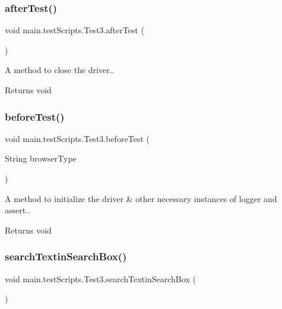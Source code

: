 \subsubsection{\texorpdfstring{after\+Test()}{afterTest()}}
{\footnotesize\ttfamily void main.\+test\+Scripts.\+Test3.\+after\+Test (\begin{DoxyParamCaption}{ }\end{DoxyParamCaption})}

A  method to close the driver.. \begin{DoxyReturn}{Returns}
void 
\end{DoxyReturn}
\mbox{\label{classmain_1_1test_scripts_1_1_test3_a6def60a96025e336f8fa0d48c7de9707}} 
\subsubsection{\texorpdfstring{before\+Test()}{beforeTest()}}
{\footnotesize\ttfamily void main.\+test\+Scripts.\+Test3.\+before\+Test (\begin{DoxyParamCaption}\item[{String}]{browser\+Type }\end{DoxyParamCaption})}

A  method to initialize the driver \& other necessary instances of logger and assert.. \begin{DoxyReturn}{Returns}
void 
\end{DoxyReturn}
\mbox{\label{classmain_1_1test_scripts_1_1_test3_a7d7770a67e1c5d3b4412342457a039f6}} 
\subsubsection{\texorpdfstring{search\+Textin\+Search\+Box()}{searchTextinSearchBox()}}
{\footnotesize\ttfamily void main.\+test\+Scripts.\+Test3.\+search\+Textin\+Search\+Box (\begin{DoxyParamCaption}{ }\end{DoxyParamCaption})}

